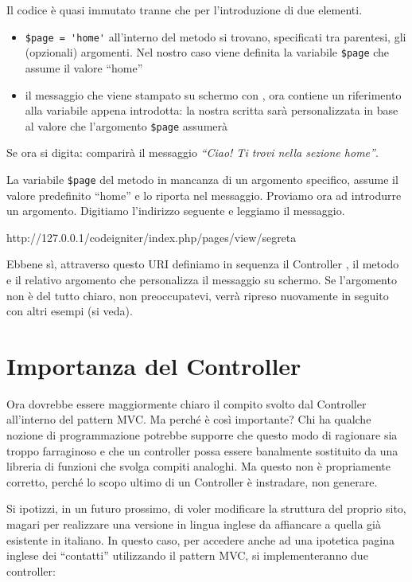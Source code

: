 Il codice è quasi immutato tranne che per l'introduzione di due elementi.

\begin{itemize}
\item \verb|$page = 'home'| all'interno del metodo  si trovano, specificati tra parentesi, gli (opzionali) argomenti. Nel nostro caso viene definita la variabile \verb|$page| che assume il valore ``home''
\item il messaggio che viene stampato su schermo con , ora contiene un riferimento alla variabile appena introdotta: la nostra scritta sarà personalizzata in base al valore che l'argomento \verb|$page| assumerà
\end{itemize}

Se ora si digita:  comparirà il messaggio \textit{``Ciao! Ti trovi nella sezione home''}.

La variabile \verb|$page| del metodo  in mancanza di un argomento specifico, assume il valore predefinito ``home'' e lo riporta nel messaggio. Proviamo ora ad introdurre un argomento. Digitiamo l'indirizzo seguente e leggiamo il messaggio.

\begin{code}
http://127.0.0.1/codeigniter/index.php/pages/view/segreta
\end{code}

Ebbene sì, attraverso questo \ac{URI} definiamo in sequenza il Controller , il metodo  e il relativo argomento  che personalizza il messaggio su schermo. Se l'argomento non è del tutto chiaro, non preoccupatevi, verrà ripreso nuovamente in seguito con altri esempi (si veda).

\label{sec:uri}
\section*{Importanza del Controller}
Ora dovrebbe essere maggiormente chiaro il compito svolto dal Controller all'interno del pattern \ac{MVC}. Ma perché è così importante? Chi ha qualche nozione di programmazione potrebbe supporre che questo modo di ragionare sia troppo farraginoso e che un controller possa essere banalmente sostituito da una libreria di funzioni che svolga compiti analoghi. Ma questo non è propriamente corretto, perché lo scopo ultimo di un Controller è instradare, non generare.

Si ipotizzi, in un futuro prossimo, di voler modificare la struttura del proprio sito, magari per realizzare una versione in lingua inglese da affiancare a quella già esistente in italiano. In questo caso, per accedere anche ad una ipotetica pagina inglese dei ``contatti'' utilizzando il pattern \ac{MVC}, si implementeranno due controller:

